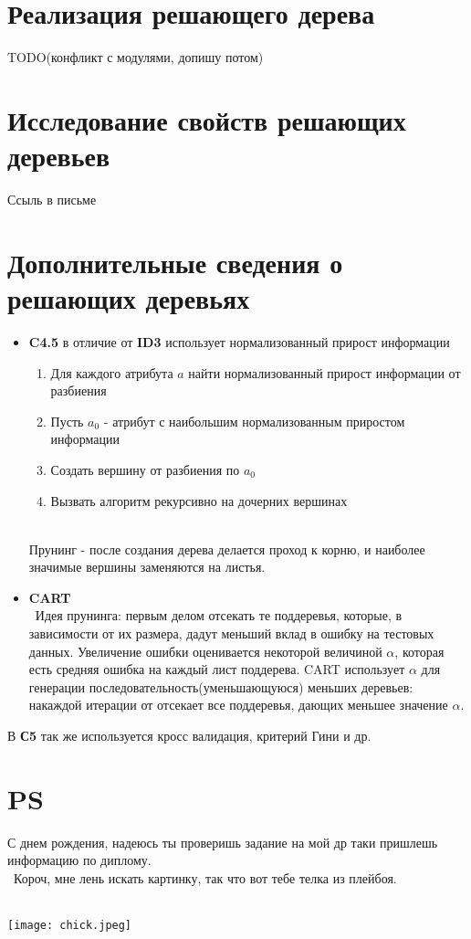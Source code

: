 \documentclass[12pt]{article}
\begin{document}
\section{Реализация решающего дерева}
TODO(конфликт с модулями, допишу потом)
\section{Исследование свойств решающих деревьев}
Ссыль в письме

\section{Дополнительные сведения о решающих деревьях}
\begin{itemize}
\item \textbf{C4.5} в отличие от \textbf{ID3} использует нормализованный прирост информации
\begin{enumerate}
\item Для каждого атрибута $a$ найти нормализованный прирост информации от разбиения
\item Пусть $a_0$ - атрибут с наибольшим нормализованным приростом информации
\item Создать вершину от разбиения по $a_0$
\item Вызвать алгоритм рекурсивно на дочерних вершинах\\\
\end{enumerate}
Прунинг - после создания дерева делается проход к корню, и наиболее значимые вершины заменяются на листья.
\item \textbf{CART}\\\
Идея прунинга: первым делом отсекать те поддеревья, которые, в зависимости от их размера, дадут меньший вклад в ошибку на тестовых данных. Увеличение ошибки оценивается некоторой величиной $\alpha$, которая есть средняя ошибка на каждый лист поддерева. CART использует $\alpha$ для генерации последовательность(уменьшающуюся) меньших деревьев: накаждой итерации от отсекает все поддеревья, дающих меньшее значение $\alpha$.
\end{itemize}
В \textbf{С5} так же используется кросс валидация, критерий Гини и др.

\section{PS}
С днем рождения, надеюсь ты проверишь задание на мой др таки пришлешь информацию по диплому.\\\
Короч, мне лень искать картинку, так что вот тебе телка из плейбоя.\\\
\newpage

\texttt{[image: chick.jpeg]}
\end{document}
